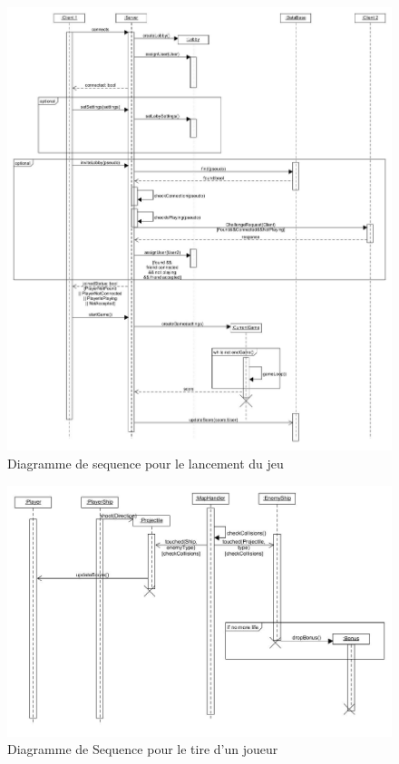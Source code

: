 \documentclass[a4paper,12pt]{article}
\begin{document}
\begin{figure}[hbtp]
\centering
\includegraphics[scale=0.3]{sequence_diagram_StartGame}
\caption{Diagramme de sequence pour le lancement du jeu}
\end{figure}

\begin{figure}[hbtp]
\centering
\includegraphics[scale=0.3]{player_shooting}
\caption{Diagramme de Sequence pour le tire d'un joueur}
\end{figure}
\end{document}
